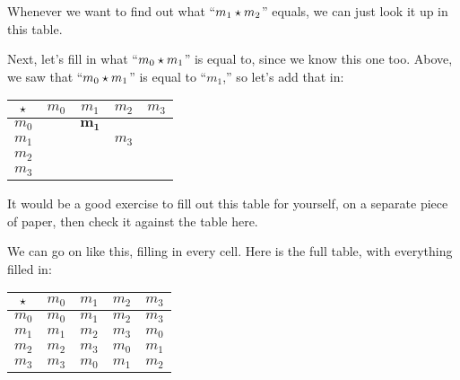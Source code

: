 \documentclass[../../../main.tex]{subfiles}
\begin{document}
Whenever we want to find out what ``$m_{1} \opSymbol/ m_{2}$'' equals, we can just look it up in this table.

Next, let's fill in what ``$m_{0} \opSymbol/ m_{1}$'' is equal to, since we know this one too. Above, we saw that ``$m_{0} \opSymbol/ m_{1}$'' is equal to ``$m_{1}$,'' so let's add that in:

\begin{center}
  \begin{tabular}{| c || c | c | c | c |}
    \hline
    $\opSymbol/$ & $m_{0}$ & \cellcolor{grey3} $m_{1}$ & $m_{2}$ & $m_{3}$ \\ \hline \hline
    \cellcolor{grey3} $m_{0}$    & \cellcolor{grey3} $~$    & \cellcolor{grey3} $\mathbf{m_{1}}$     & $~$     & $~$     \\ \hline
    $m_{1}$    & $~$    & $~$     & $m_{3}$     & $~$     \\ \hline
    $m_{2}$    & $~$    & $~$     & $~$     & $~$     \\ \hline
    $m_{3}$    & $~$    & $~$     & $~$     & $~$     \\ \hline
  \end{tabular}
\end{center}

\begin{aside}
  \begin{remark}
    It would be a good exercise to fill out this table for yourself, on a separate piece of paper, then check it against the table here.
  \end{remark}
\end{aside}

We can go on like this, filling in every cell. Here is the full table, with everything filled in:

\begin{center}
  \begin{tabular}{| c || c | c | c | c |}
    \hline
    $\opSymbol/$ & $m_{0}$ & $m_{1}$ & $m_{2}$ & $m_{3}$ \\ \hline \hline
    $m_{0}$    & $m_{0}$ & $m_{1}$ & $m_{2}$ & $m_{3}$ \\ \hline
    $m_{1}$    & $m_{1}$ & $m_{2}$ & $m_{3}$ & $m_{0}$ \\ \hline
    $m_{2}$    & $m_{2}$ & $m_{3}$ & $m_{0}$ & $m_{1}$ \\ \hline
    $m_{3}$    & $m_{3}$ & $m_{0}$ & $m_{1}$ & $m_{2}$ \\ \hline
  \end{tabular}
\end{center}
\end{document}
